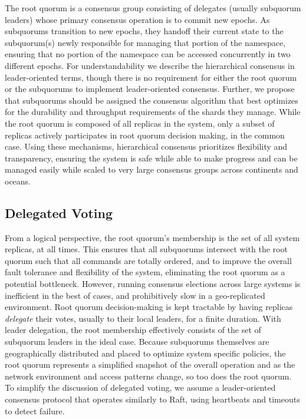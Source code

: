 \documentclass[10pt,conference]{IEEEtran}
\newcommand{\hc}{hierarchical consensus\xspace}
\newcommand{\sub}{subquorum\xspace}
\newcommand{\subs}{subquorums\xspace}
\newcommand{\roo}{root quorum\xspace}
\begin{document}
The \roo is a consensus group consisting of delegates (usually subquorum leaders) whose
primary consensus operation is to commit new epochs.
As \subs transition to new epochs, they handoff their current state to the \sub(s)
newly responsible for managing that portion of the namespace, ensuring that no portion
of the namespace can be accessed concurrently in two different epochs.
For understandability we describe the \hc in leader-oriented terms, though there is no
requirement for either the \roo or the \subs to implement leader-oriented consensus.
Further, we propose that \subs should be assigned the consensus algorithm that best
optimizes for the durability and throughput requirements of the shards they manage.
While the root quorum is composed of all replicas in the system, only a subset of
replicas actively participates in root quorum decision making, in the common case.
Using these mechanisms, \hc prioritizes flexibility and transparency, ensuring the
system is safe while able to make progress and can be managed easily while scaled to
very large consensus groups across continents and oceans.

\subsection{Delegated Voting}
\label{section:delegation}

From a logical perspective, the \roo's membership is the set of all system replicas, at
all times.
This ensures that all \subs intersect with the \roo such that all commands are totally
ordered, and to improve the overall fault tolerance and flexibility of the system,
eliminating the \roo as a potential bottleneck.
However, running consensus elections across large systems is inefficient in the best of
cases, and prohibitively slow in a geo-replicated environment.
Root quorum decision-making is kept tractable by having replicas \emph{delegate} their
votes, usually to their local leaders, for a finite duration.
With leader delegation, the root membership effectively consists of the set of \sub
leaders in the ideal case.
Because \subs themselves are geographically distributed and placed to optimize system
specific policies, the \roo represents a simplified snapshot of the overall operation
and as the network environment and access patterns change, so too does the \roo.
To simplify the discussion of delegated voting, we assume a leader-oriented consensus
protocol that operates similarly to Raft, using heartbeats and timeouts to detect
failure.
\end{document}
